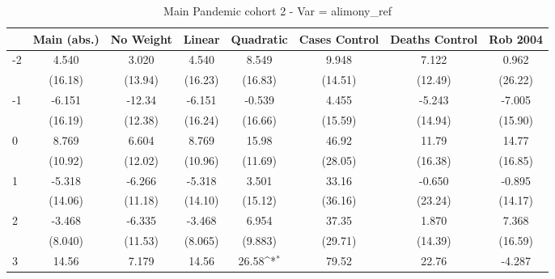\documentclass{article}
\begin{document}
{
\def\sym#1{\ifmmode^{#1}\else\(^{#1}\)\fi}
\begin{longtable}{l*{7}{c}}
\caption{Main Pandemic cohort 2 - Var = alimony\_ref}\\
\hline\hline\endfirsthead\hline\endhead\hline\endfoot\endlastfoot
                &\multicolumn{1}{c}{Main (abs.)}&\multicolumn{1}{c}{No Weight}&\multicolumn{1}{c}{Linear}&\multicolumn{1}{c}{Quadratic}&\multicolumn{1}{c}{Cases Control}&\multicolumn{1}{c}{Deaths Control}&\multicolumn{1}{c}{Rob 2004}\\
\hline
-2              &    4.540         &    3.020         &    4.540         &    8.549         &    9.948         &    7.122         &    0.962         \\
                &  (16.18)         &  (13.94)         &  (16.23)         &  (16.83)         &  (14.51)         &  (12.49)         &  (26.22)         \\
-1              &   -6.151         &   -12.34         &   -6.151         &   -0.539         &    4.455         &   -5.243         &   -7.005         \\
                &  (16.19)         &  (12.38)         &  (16.24)         &  (16.66)         &  (15.59)         &  (14.94)         &  (15.90)         \\
0               &    8.769         &    6.604         &    8.769         &    15.98         &    46.92         &    11.79         &    14.77         \\
                &  (10.92)         &  (12.02)         &  (10.96)         &  (11.69)         &  (28.05)         &  (16.38)         &  (16.85)         \\
1               &   -5.318         &   -6.266         &   -5.318         &    3.501         &    33.16         &   -0.650         &   -0.895         \\
                &  (14.06)         &  (11.18)         &  (14.10)         &  (15.12)         &  (36.16)         &  (23.24)         &  (14.17)         \\
2               &   -3.468         &   -6.335         &   -3.468         &    6.954         &    37.35         &    1.870         &    7.368         \\
                &  (8.040)         &  (11.53)         &  (8.065)         &  (9.883)         &  (29.71)         &  (14.39)         &  (16.59)         \\
3               &    14.56         &    7.179         &    14.56         &    26.58\sym{*}  &    79.52         &    22.76         &   -4.287         \\

\end{longtable}}
\end{document}
